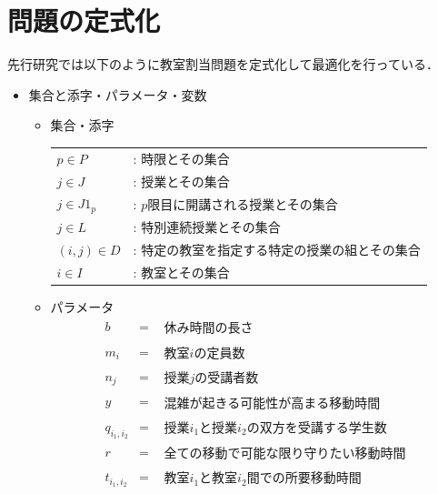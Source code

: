 \documentclass[12pt, a4paper, fleqn]{jreport}
\begin{document}
\section{問題の定式化}
先行研究では以下のように教室割当問題を定式化して最適化を行っている．
\begin{itemize}
\item 集合と添字・パラメータ・変数
\begin{itemize}
\item 集合・添字\\
\begin{tabular}{ll}
$p \in P$    &: 時限とその集合\\
$j \in J$    &: 授業とその集合\\
$j \in J1_p$ &: $p$限目に開講される授業とその集合\\
$j \in L$    &: 特別連続授業とその集合\\
$(i,j) \in D$&: 特定の教室を指定する特定の授業の組とその集合\\
$i \in I$    &: 教室とその集合\\
\end{tabular}
\item パラメータ
\[
\begin{array}{rcl}
b & = &
\begin{array}{ll}
\mbox{休み時間の長さ} 
\end{array}
\\
m_{i} & = & 
\begin{array}{ll}
 \mbox{教室$i$の定員数} 
\end{array}
\\
n_{j} & = & 
\begin{array}{ll}
 \mbox{授業$j$の受講者数} 
\end{array}
\\
y & = & 
\begin{array}{ll}
 \mbox{混雑が起きる可能性が高まる移動時間} 
\end{array}
\\
q_{i_1,i_2} & = & 
\begin{array}{ll}
 \mbox{授業$i_1$と授業$i_2$の双方を受講する学生数} 
\end{array}
\\
r & = & 
\begin{array}{ll}
 \mbox{全ての移動で可能な限り守りたい移動時間} 
\end{array}
\\
t_{i_1,i_2} & = & 
\begin{array}{ll}
 \mbox{教室$i_1$と教室$i_2$間での所要移動時間} 
\end{array}

\end{array}\]
\end{itemize}
\end{itemize}
\end{document}
